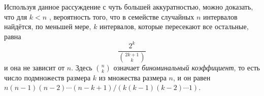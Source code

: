 Используя данное рассуждение с чуть большей аккуратностью, можно доказать, что 
для $k < n$ , вероятность того, что в семействе случайных $n$ интервалов найдётся, по меньшей мере, $k$ интервалов, которые пересекают все остальные, равна
\[\frac{2^k}{\binom{2k+1} k}\]
и она не зависит от $n$.
Здесь $\binom n k$ означает \emph{биноминальный коэффициент}, то есть число подмножеств размера $k$ из множества размера $n$, и он равен $n(n-1)(n-2)\cdots(n-k+1) /(k(k-1)(k-2)\cdots1)$.
